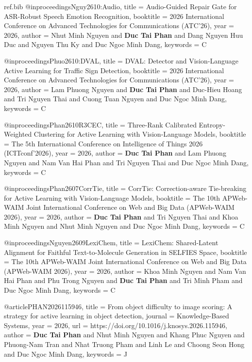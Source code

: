 \begin{filecontents*}{ref.bib}
@inproceedings{Nguy2610:Audio,
  title = {Audio-Guided Repair Gate for ASR-Robust Speech Emotion Recognition},
  booktitle = {2026 International Conference on Advanced Technologies for Communications (ATC'26)},
  year = {2026},
  author = {Nhut Minh Nguyen and \textbf{Duc Tai Phan} and Dang Nguyen Huu Duc and Nguyen Thu Ky and Duc Ngoc Minh Dang},
  keywords = {C}
}

@inproceedings{Phuo2610:DVAL,
  title = {DVAL: Detector and Vision-Language Active Learning for Traffic Sign Detection},
  booktitle = {2026 International Conference on Advanced Technologies for Communications (ATC'26)},
  year = {2026},
  author = {Lam Phuong Nguyen and \textbf{Duc Tai Phan} and Duc-Hieu Hoang and Tri Nguyen Thai and Cuong Tuan Nguyen and Duc Ngoc Minh Dang},
  keywords = {C}
}

@inproceedings{Phan2610R3CEC,
  title = {Three-Rank Calibrated Entropy-Weighted Clustering for Active Learning with Vision-Language Models},
  booktitle = {The 5th International Conference on Intelligence of Things 2026 (ICITconf'2026)},
  year = {2026},
  author = {\textbf{Duc Tai Phan} and Lam Phuong Nguyen and Nam Van Hai Phan and Tri Nguyen Thai and Duc Ngoc Minh Dang},
  keywords = {C}
}

@inproceedings{Phan2607CorrTie,
  title = {CorrTie: Correction-aware Tie-breaking for Active Learning with Vision-Language Models},
  booktitle = {The 10th APWeb-WAIM Joint International Conference on Web and Big Data (APWeb-WAIM 2026)},
  year = {2026},
  author = {\textbf{Duc Tai Phan} and Tri Nguyen Thai and Khoa Minh Nguyen and Nhut Minh Nguyen and Duc Ngoc Minh Dang},
  keywords = {C}
}

@inproceedings{Nguyen2609LexiChem,
  title = {LexiChem: Shared-Latent Alignment for Faithful Text-to-Molecule Generation in SELFIES Space},
  booktitle = {The 10th APWeb-WAIM Joint International Conference on Web and Big Data (APWeb-WAIM 2026)},
  year = {2026},
  author = {Khoa Minh Nguyen and Nam Van Hai Phan and Phu Trong Nguyen and \textbf{Duc Tai Phan} and Tri Minh Pham and Duc Ngoc Minh Dang},
  keywords = {C}
}

@article{PHAN2026115946,
  title = {From object difficulty to image scoring: A strategy for active learning in object detection},
  journal = {Knowledge-Based Systems},
  year = {2026},
  url = {https://doi.org/10.1016/j.knosys.2026.115946},
  author = {\textbf{Duc Tai Phan} and Nhut Minh Nguyen and Khang Phuc Nguyen and Phuong-Nam Tran and Nhat Truong Pham and Linh Le and Choong Seon Hong and Duc Ngoc Minh Dang},
  keywords = {J}
}


\end{filecontents*}
